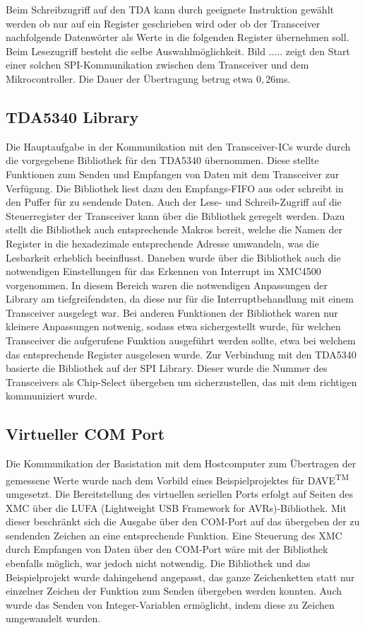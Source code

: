 Beim Schreibzugriff auf den TDA kann durch geeignete Instruktion gewählt werden ob nur auf ein Register geschrieben wird oder ob der Transceiver nachfolgende Datenwörter als Werte in die folgenden Register übernehmen soll. 
Beim Lesezugriff besteht die selbe Auswahlmöglichkeit. Bild ..... zeigt den Start einer solchen \ac{SPI}-Kommunikation zwischen dem Transceiver und dem Mikrocontroller. Die Dauer der Übertragung betrug etwa $0,26$ms.  %







\subsection{TDA5340 Library}
Die Hauptaufgabe in der Kommunikation mit den Transceiver-\acp{IC} wurde durch die vorgegebene Bibliothek für den TDA5340 übernommen. Diese stellte Funktionen zum Senden und Empfangen von Daten mit dem Transceiver zur Verfügung. Die Bibliothek liest dazu den Empfangs-\ac{FIFO} aus oder schreibt in den Puffer für zu sendende Daten. Auch der Lese- und Schreib-Zugriff auf die Steuerregister der Transceiver kann über die Bibliothek geregelt werden. Dazu stellt die Bibliothek auch entsprechende Makros bereit, welche die Namen der Register in die hexadezimale entsprechende Adresse umwandeln, was die Lesbarkeit erheblich beeinflusst. Daneben wurde über die Bibliothek auch die notwendigen  Einstellungen für das Erkennen von Interrupt im XMC4500 vorgenommen. In diesem Bereich waren die notwendigen Anpassungen der Library am tiefgreifendsten, da diese nur für die Interruptbehandlung mit einem Transceiver ausgelegt war. Bei anderen Funktionen der Bibliothek waren nur kleinere Anpassungen notwenig, sodass etwa sichergestellt wurde, für welchen Transceiver die aufgerufene Funktion ausgeführt werden sollte, etwa bei welchem das entsprechende Register ausgelesen wurde.
Zur Verbindung mit den TDA5340 basierte die Bibliothek auf der SPI Library. Dieser wurde die Nummer des Transceivers als Chip-Select übergeben um sicherzustellen, das mit dem richtigen kommuniziert wurde.

\subsection{Virtueller COM Port}
Die Kommunikation der Basistation mit dem Hostcomputer zum Übertragen der gemessene Werte wurde nach dem Vorbild eines Beispielprojektes für DAVE\textsuperscript{TM} umgesetzt. Die Bereitstellung des virtuellen seriellen Ports erfolgt auf Seiten des XMC über die LUFA (Lightweight USB Framework for AVRs)-Bibliothek. Mit dieser beschränkt sich die Ausgabe über den COM-Port auf das übergeben der zu sendenden Zeichen an eine entsprechende Funktion. Eine Steuerung des XMC durch Empfangen von Daten über den COM-Port wäre mit der Bibliothek ebenfalls möglich, war jedoch nicht notwendig.
Die Bibliothek und das Beispielprojekt wurde dahingehend angepasst, das ganze Zeichenketten statt nur einzelner Zeichen der Funktion zum Senden übergeben werden konnten. Auch wurde das Senden von Integer-Variablen ermöglicht, indem diese zu Zeichen umgewandelt wurden. 
